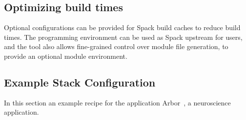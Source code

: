 \subsection{Optimizing build times}
Optional configurations can be provided for Spack build caches to reduce build times.
The programming environment can be used as Spack upstream for users, and the tool also allows fine-grained control over module file generation, to provide an optional module environment.

\subsection{Example Stack Configuration}

In this section an example recipe for the application Arbor~\cite{paper:arbor2019,software:arbor}, a neuroscience application.




%

